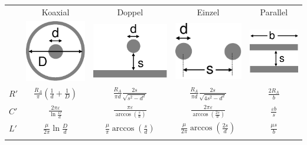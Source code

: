 \documentclass[fs, footer]{latex4ei}
\begin{document}
\begin{multicols*}{4}
{	\begin{tabular}{@{}lcccc@{}} \trule
	 & Koaxial & Doppel & Einzel & Parallel\\ 
	 & \includegraphics[scale = 0.3]{./img/koaxial.pdf} & \includegraphics[scale = 0.3]{./img/einzel.pdf} & \includegraphics[scale = 0.3]{./img/doppel.pdf} & \includegraphics[scale = 0.3]{./img/parallel.pdf}\\ \mrule
	$R'$ & $\frac{R_A}{\pi} \left( \frac{1}{d} + \frac{1}{D} \right)$ & $\frac{R_A}{\pi d} \frac{2 s}{\sqrt{s^2 -d^2}}$ & $\frac{R_A}{\pi d} \frac{2 s}{\sqrt{4s^2 -d^2}}$ & $\frac{2 R_A}{b}$\\[1.5em]
	$C'$ & $\frac{2 \pi \varepsilon}{\ln \frac{D}{d} }$ & $\frac{\pi \varepsilon}{\arccos\left( \frac{s}{d} \right)}$ & $\frac{2 \pi \varepsilon}{\arccos\left( \frac{2 s}{d} \right)}$ & $\frac{\varepsilon b}{s}$\\[1.5em]
	$L'$ & $\frac{\mu}{2 \pi} \ln \frac{D}{d} $ & $\frac{\mu}{\pi} \arccos\left( \frac{s}{d} \right)$ & $\frac{\mu}{2 \pi} \arccos\left( \frac{2 s}{d} \right)$ & $\frac{\mu s}{b}$\\ \brule
	\end{tabular}
}


\end{multicols*}
\end{document}
